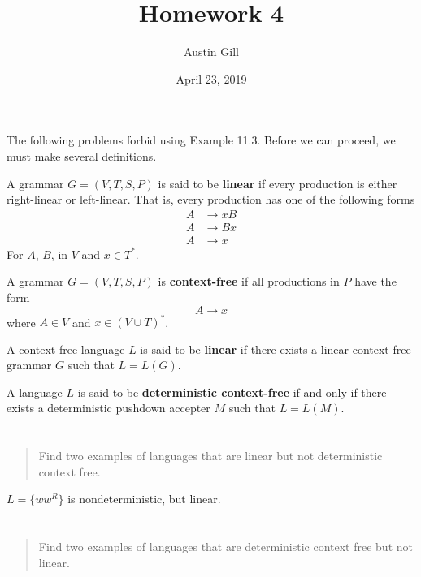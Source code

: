 \documentclass{article}
\title{Homework 4}
\author{Austin Gill}
\date{April 23, 2019}
\begin{document}
\maketitle

The following problems forbid using Example 11.3. Before we can proceed, we must make several definitions.

\begin{defn}
    A grammar $G = (V, T, S, P)$ is said to be \textbf{linear} if every production is either right-linear or left-linear. That is, every production has one of the following forms
    \begin{align*}
        A & \to xB \\
        A & \to Bx \\
        A & \to x
    \end{align*}
    For $A$, $B$, in $V$ and $x \in T^*$.
\end{defn}

\begin{defn}
    A grammar $G = (V, T, S, P)$ is \textbf{context-free} if all productions in $P$ have the form \[A \to x\] where $A \in V$ and $x \in {(V \cup T)}^*$.
\end{defn}

\begin{defn}
    A context-free language $L$ is said to be \textbf{linear} if there exists a linear context-free grammar $G$ such that $L = L(G)$.
\end{defn}

\begin{defn}
    A language $L$ is said to be \textbf{deterministic context-free} if and only if there exists a deterministic pushdown accepter $M$ such that $L = L(M)$.
\end{defn}

\section{}
\begin{quote}
    Find two examples of languages that are linear but not deterministic context free.
\end{quote}

$L = \{ww^R\}$ is nondeterministic, but linear.


\section{}
\begin{quote}
    Find two examples of languages that are deterministic context free but not linear.
\end{quote}
\end{document}
